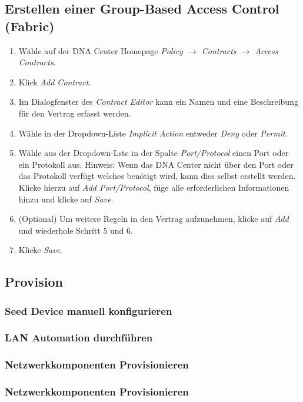 \subsection{Erstellen einer Group-Based Access Control (Fabric)}
\begin{enumerate}
	\item Wähle auf der DNA Center Homepage \textit{Policy $\rightarrow$ Contracts $\rightarrow$ Access Contracts}.
	\item Klick \textit{Add Contract}.
	\item Im Dialogfenster des \textit{Contract Editor} kann ein Namen und eine Beschreibung für den Vertrag erfasst werden.
	\item Wähle in der Dropdown-Liste \textit{Implicit Action} entweder \textit{Deny} oder \textit{Permit}.
	\item Wähle aus der Dropdown-Lste in der Spalte \textit{Port/Protocol} einen Port oder ein Protokoll aus. Hinweis: Wenn das DNA Center nicht über den Port oder das Protokoll verfügt welches benötigt wird, kann dies selbst erstellt werden. Klicke hierzu auf \textit{Add Port/Protocol}, füge alle erforderlichen Informationen hinzu und klicke auf \textit{Save}.
	\item (Optional) Um weitere Regeln in den Vertrag aufzunehmen, klicke auf \textit{Add} und wiederhole Schritt 5 und 6.
	\item Klicke \textit{Save}.
\end{enumerate}

\subsection{Provision}
\subsubsection{Seed Device manuell konfigurieren}

\subsubsection{LAN Automation durchführen}

\subsubsection{Netzwerkkomponenten Provisionieren}

\subsubsection{Netzwerkkomponenten Provisionieren}

